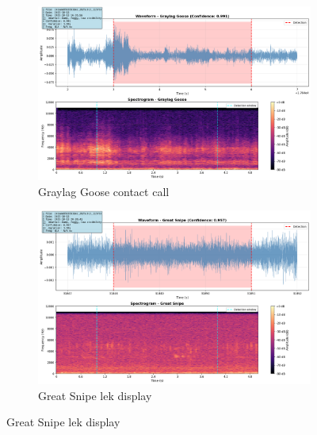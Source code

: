 \documentclass[twocolumn]{article}
\begin{document}
\begin{figure}[H]
\centering
\begin{subfigure}{0.45\textwidth}
\includegraphics[width=\textwidth]{figures/spectrogram_graylag.png}
\caption{Graylag Goose contact call}
\end{subfigure}
\hfill
\begin{subfigure}{0.45\textwidth}
\includegraphics[width=\textwidth]{figures/spectrogram_snipe.png}
\caption{Great Snipe lek display}
\end{subfigure}


\end{figure}
\end{document}
